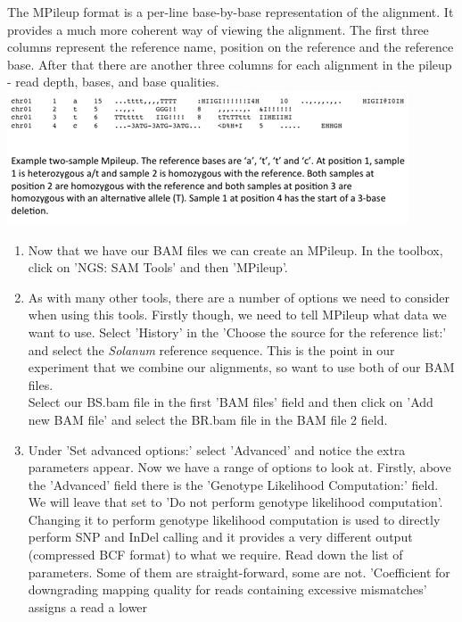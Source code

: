 \documentclass[12pt,a4paper]{article}
\begin{document}
The MPileup format is a per-line base-by-base representation of the
alignment. It provides a much more coherent way of viewing the
alignment. The first three columns represent the reference name,
position on the reference and the reference base. After that there are
another three columns for each alignment in the pileup - read depth,
bases, and base qualities.  \\
\includegraphics{images/mpileup.jpg}
\begin{enumerate}
	\item Now that we have our BAM files we can create an
          MPileup. In the toolbox, click on 'NGS: SAM Tools' and then
          'MPileup'.
	\item As with many other tools, there are a number of options
          we need to consider when using this tools. Firstly though,
          we need to tell MPileup what data we want to use. Select
          'History' in the 'Choose the source for the reference list:'
          and select the \emph{Solanum} reference sequence. This is
          the point in our experiment that we combine our alignments,
          so want to use both of our BAM files.  \\Select our BS.bam
          file in the first 'BAM files' field and then click on 'Add
          new BAM file' and select the BR.bam file in the BAM file 2
          field.
	\item Under 'Set advanced options:' select 'Advanced' and
          notice the extra parameters appear. Now we have a range of
          options to look at. Firstly, above the 'Advanced' field
          there is the 'Genotype Likelihood Computation:' field. We
          will leave that set to 'Do not perform genotype likelihood
          computation'. Changing it to perform genotype likelihood
          computation is used to directly perform SNP and InDel
          calling and it provides a very different output (compressed
          BCF format) to what we require. Read down the list of
          parameters. Some of them are straight-forward, some are
          not. 'Coefficient for downgrading mapping quality for reads
          containing excessive mismatches' assigns a read a lower

\end{enumerate}
\end{document}
